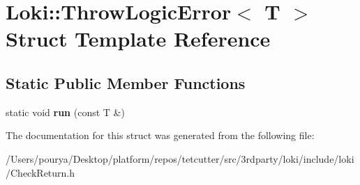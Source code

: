 \hypertarget{structLoki_1_1ThrowLogicError}{}\section{Loki\+:\+:Throw\+Logic\+Error$<$ T $>$ Struct Template Reference}
\label{structLoki_1_1ThrowLogicError}
\subsection*{Static Public Member Functions}
\begin{DoxyCompactItemize}
\item 
\hypertarget{structLoki_1_1ThrowLogicError_aec45a5c2561f2a6e4f568662ee802c93}{}static void {\bfseries run} (const T \&)\label{structLoki_1_1ThrowLogicError_aec45a5c2561f2a6e4f568662ee802c93}

\end{DoxyCompactItemize}


The documentation for this struct was generated from the following file\+:\begin{DoxyCompactItemize}
\item 
/\+Users/pourya/\+Desktop/platform/repos/tetcutter/src/3rdparty/loki/include/loki/Check\+Return.\+h\end{DoxyCompactItemize}
